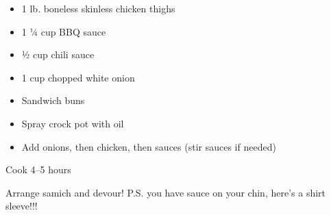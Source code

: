 \fromMom


\ingredients
\begin{itemize}
\item 1 lb. boneless skinless chicken thighs
\item 1 ¼ cup BBQ sauce
\item ½ cup chili sauce
\item 1 cup chopped white onion
\item Sandwich buns
\item Spray crock pot with oil
\item Add onions, then chicken, then sauces (stir sauces if needed)
\end{itemize}

\instructions

Cook 4--5 hours

Arrange samich and devour! P.S. you have sauce on your chin, here's a
shirt sleeve!!!
